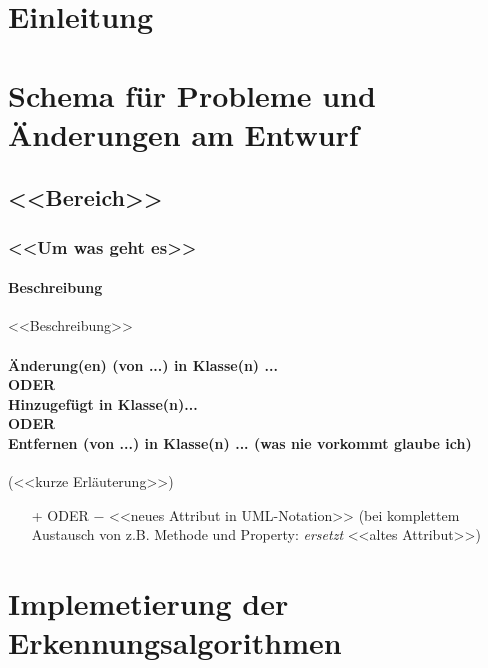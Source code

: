 \documentclass[a4paper,12pt]{article}
\title{\projektName}
\date{\today}
\author{Tec O'Brain}
\begin{document}
\setcounter{page}{2}
\tableofcontents          %
\clearpage
{}

\section{Einleitung}


%
\section{Schema für Probleme und Änderungen am Entwurf}
\subsection{<<Bereich>>}
\subsubsection{<<Um was geht es>>}
\paragraph{Beschreibung}
<<Beschreibung>>
\paragraph{
  Änderung(en) (von ...) in Klasse(n) ... \\
  ODER \\
  Hinzugefügt in Klasse(n)... \\
  ODER \\
  Entfernen (von ...) in Klasse(n) ... (was nie vorkommt glaube ich) }
(<<kurze Erläuterung>>)
\begin{itemize}
  \item[+ ODER $-$] <<neues Attribut in UML-Notation>> (bei komplettem Austausch von z.B. Methode und Property: \textit{ersetzt} <<altes Attribut>>)
\end{itemize}
%
\section{Implemetierung der Erkennungsalgorithmen}
\end{document}
